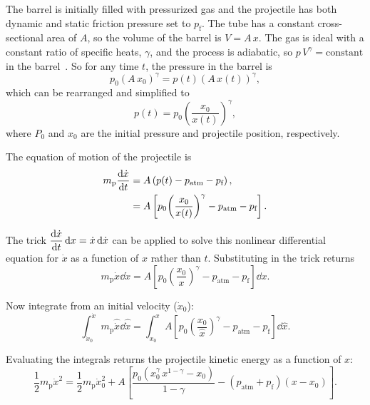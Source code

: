 The barrel is initially filled with pressurized gas and the projectile has both dynamic and static friction pressure set to $p_\text{f}$.
The tube has a constant cross-sectional area of $A$, so the volume of the barrel is $V = A\,x$.
The gas is ideal with a constant ratio of specific heats, $\gamma$, and the process is adiabatic, so $p\,V^\gamma = \text{constant}$ in the barrel~\citep[p.~129, eq.~3.53]{moran_fundamentals_2008}.
So for any time $t$, the pressure in the barrel is
\begin{equation}
    p_0 {(A\,x_0)}^\gamma = p(t) {(A\,x(t))}^\gamma,
\end{equation}
which can be rearranged and simplified to
\begin{equation}
    p(t) = p_0 {\left(\frac{x_0}{x(t)}\right)}^\gamma,
\end{equation}
where $P_0$ and $x_0$ are the initial pressure and projectile position, respectively.

The equation of motion of the projectile is
\begin{align}
    m_\text{p} \dv{\dot{x}}{t} &= A \left(p(t) - p_\text{atm} - p_\text{f}\right), \\
                                                       &= A \left[p_0 {\left(\frac{x_0}{x(t)}\right)}^\gamma - p_\text{atm} - p_\text{f}\right].
\end{align}

The trick $\displaystyle \dv{\dot{x}}{t} \dd{x} = \dot{x} \dd{\dot{x}}$ can be applied to solve this nonlinear differential equation for $\dot{x}$ as a function of $x$ rather than $t$.
Substituting in the trick returns
\begin{equation}
    m_\text{p} \dot{x} \dd{\dot{x}} = A \left[p_0 {\left(\frac{x_0}{x}\right)}^\gamma - p_\text{atm} - p_\text{f}\right] \dd{x}.
\end{equation}

Now integrate from an initial velocity ($\dot{x}_0$):
\begin{equation}
    \int_{\dot{x}_0}^{\dot{x}} m_\text{p} \hat{\dot{x}} \dd{\hat{\dot{x}}} = \int_{x_0}^x A \left[p_0 {\left(\frac{x_0}{\hat{x}}\right)}^\gamma - p_\text{atm} - p_\text{f}\right] \dd{\hat{x}}.
\end{equation}

Evaluating the integrals returns the projectile kinetic energy as a function of $x$:
\begin{equation}
    \frac{1}{2} m_\text{p} \dot{x}^2 = \frac{1}{2} m_\text{p} \dot{x}_0^2 + A \left[\frac{p_0 \left(x_0^\gamma\,x^{1-\gamma} - x_0\right)}{1 - \gamma} - (p_\text{atm} + p_\text{f}) (x - x_0)\right].
\end{equation}

